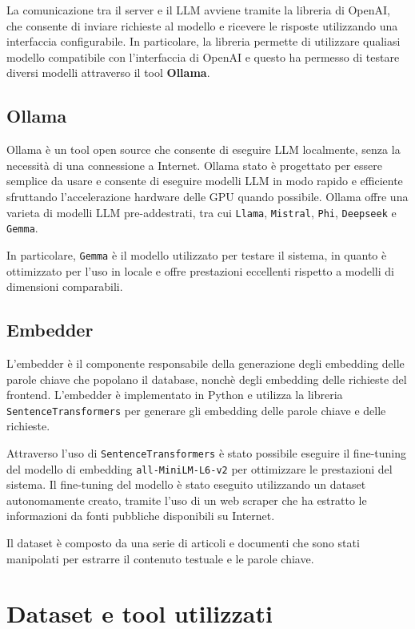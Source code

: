 La comunicazione tra il server e il LLM avviene tramite la
libreria di OpenAI, che consente di inviare richieste al
modello e ricevere le risposte utilizzando una interfaccia
configurabile.
In particolare, la libreria permette di utilizzare qualiasi
modello compatibile con l'interfaccia di OpenAI e questo ha
permesso di testare diversi modelli attraverso il tool
\textbf{Ollama}.

\subsection{Ollama}
\label{sec:ollama}
Ollama è un tool open source che consente di eseguire LLM
localmente, senza la necessità di una connessione a
Internet.
Ollama stato è progettato per essere semplice da usare e
consente di eseguire modelli LLM in modo rapido e
efficiente sfruttando l'accelerazione hardware delle GPU
quando possibile.
Ollama offre una varieta di modelli LLM pre-addestrati, tra
cui \texttt{Llama}, \texttt{Mistral}, \texttt{Phi},
\texttt{Deepseek} e \texttt{Gemma}.

In particolare, \texttt{Gemma} è il modello utilizzato per
testare il sistema, in quanto è ottimizzato per l'uso in
locale e offre prestazioni eccellenti rispetto a modelli di
dimensioni comparabili.

\subsection{Embedder}
\label{sec:embedder}
L'embedder è il componente responsabile della generazione
degli embedding delle parole chiave che popolano il
database, nonchè degli embedding delle richieste del
frontend.
L'embedder è implementato in Python e utilizza la libreria
\texttt{SentenceTransformers}\cite{reimers-2019-sentence-bert}
per generare gli embedding delle parole chiave e delle
richieste.

Attraverso l'uso di \texttt{SentenceTransformers} è stato
possibile eseguire il fine-tuning del modello di embedding
\texttt{all-MiniLM-L6-v2} per ottimizzare le prestazioni
del sistema.
Il fine-tuning del modello è stato eseguito utilizzando un
dataset autonomamente creato, tramite l'uso di un web
scraper che ha estratto le informazioni da fonti pubbliche
disponibili su Internet.

Il dataset è composto da una serie di articoli e documenti
che sono stati manipolati per estrarre il contenuto
testuale e le parole chiave.

\section{Dataset e tool utilizzati}
\label{sec:dataset}

